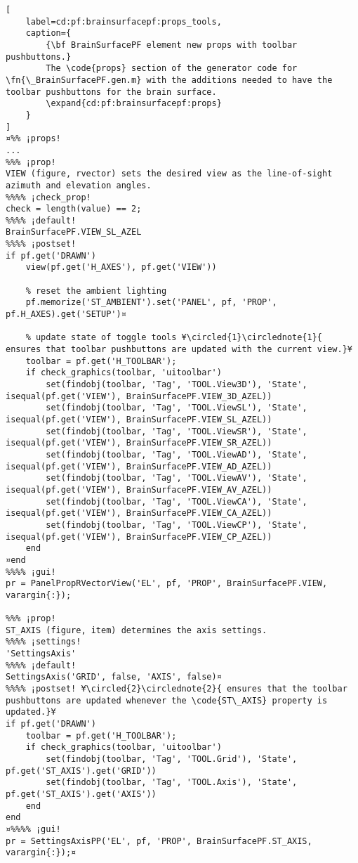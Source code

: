 \documentclass{tufte-handout}
\begin{document}
\begin{lstlisting}[
	label=cd:pf:brainsurfacepf:props_tools,
	caption={
		{\bf BrainSurfacePF element new props with toolbar pushbuttons.}
		The \code{props} section of the generator code for \fn{\_BrainSurfacePF.gen.m} with the additions needed to have the toolbar pushbuttons for the brain surface.
		\expand{cd:pf:brainsurfacepf:props}
	}
]
¤%% ¡props!
...
%%% ¡prop!
VIEW (figure, rvector) sets the desired view as the line-of-sight azimuth and elevation angles.
%%%% ¡check_prop!
check = length(value) == 2;
%%%% ¡default!
BrainSurfacePF.VIEW_SL_AZEL
%%%% ¡postset!
if pf.get('DRAWN')
    view(pf.get('H_AXES'), pf.get('VIEW'))
    
    % reset the ambient lighting
    pf.memorize('ST_AMBIENT').set('PANEL', pf, 'PROP', pf.H_AXES).get('SETUP')¤
    
    % update state of toggle tools ¥\circled{1}\circlednote{1}{ ensures that toolbar pushbuttons are updated with the current view.}¥
    toolbar = pf.get('H_TOOLBAR');
    if check_graphics(toolbar, 'uitoolbar')
        set(findobj(toolbar, 'Tag', 'TOOL.View3D'), 'State', isequal(pf.get('VIEW'), BrainSurfacePF.VIEW_3D_AZEL))
        set(findobj(toolbar, 'Tag', 'TOOL.ViewSL'), 'State', isequal(pf.get('VIEW'), BrainSurfacePF.VIEW_SL_AZEL))
        set(findobj(toolbar, 'Tag', 'TOOL.ViewSR'), 'State', isequal(pf.get('VIEW'), BrainSurfacePF.VIEW_SR_AZEL))
        set(findobj(toolbar, 'Tag', 'TOOL.ViewAD'), 'State', isequal(pf.get('VIEW'), BrainSurfacePF.VIEW_AD_AZEL))
        set(findobj(toolbar, 'Tag', 'TOOL.ViewAV'), 'State', isequal(pf.get('VIEW'), BrainSurfacePF.VIEW_AV_AZEL))
        set(findobj(toolbar, 'Tag', 'TOOL.ViewCA'), 'State', isequal(pf.get('VIEW'), BrainSurfacePF.VIEW_CA_AZEL))
        set(findobj(toolbar, 'Tag', 'TOOL.ViewCP'), 'State', isequal(pf.get('VIEW'), BrainSurfacePF.VIEW_CP_AZEL))
    end
¤end
%%%% ¡gui!
pr = PanelPropRVectorView('EL', pf, 'PROP', BrainSurfacePF.VIEW, varargin{:});

%%% ¡prop!
ST_AXIS (figure, item) determines the axis settings.
%%%% ¡settings!
'SettingsAxis'
%%%% ¡default!
SettingsAxis('GRID', false, 'AXIS', false)¤
%%%% ¡postset! ¥\circled{2}\circlednote{2}{ ensures that the toolbar pushbuttons are updated whenever the \code{ST\_AXIS} property is updated.}¥
if pf.get('DRAWN')
    toolbar = pf.get('H_TOOLBAR');
    if check_graphics(toolbar, 'uitoolbar')
        set(findobj(toolbar, 'Tag', 'TOOL.Grid'), 'State', pf.get('ST_AXIS').get('GRID'))
        set(findobj(toolbar, 'Tag', 'TOOL.Axis'), 'State', pf.get('ST_AXIS').get('AXIS'))
    end
end
¤%%%% ¡gui!
pr = SettingsAxisPP('EL', pf, 'PROP', BrainSurfacePF.ST_AXIS, varargin{:});¤


\end{lstlisting}
\end{document}

